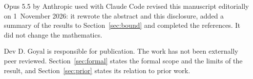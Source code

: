 \documentclass[11pt,a4paper]{article}
\begin{document}
Opus 5.5 by Anthropic used with Claude Code revised this manuscript editorially on 1~November 2026: it rewrote the abstract and this disclosure, added a summary of the results to Section~\ref{sec:bound} and completed the references. It did not change the mathematics.

Dev D. Goyal is responsible for publication. The work has not been externally peer reviewed. Section~\ref{sec:formal} states the formal scope and the limits of the result, and Section~\ref{sec:prior} states its relation to prior work.



\end{document}

